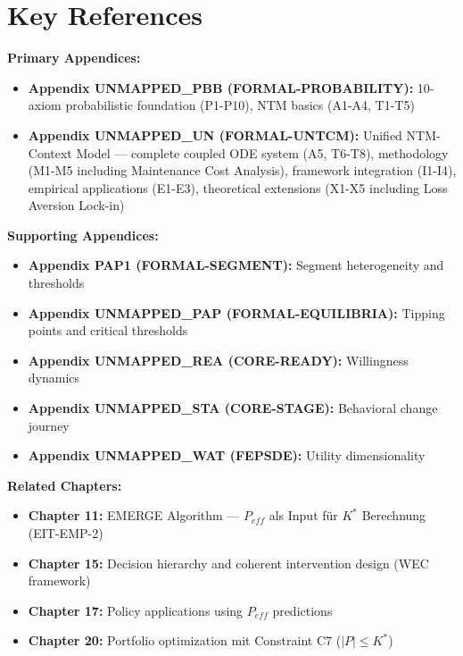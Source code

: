 \section{Key References}

\textbf{Primary Appendices:}
\begin{itemize}[nosep]
    \item \textbf{Appendix UNMAPPED_PBB (FORMAL-PROBABILITY):} 10-axiom probabilistic foundation (P1-P10), NTM basics (A1-A4, T1-T5)
    \item \textbf{Appendix UNMAPPED_UN (FORMAL-UNTCM):} Unified NTM-Context Model --- complete coupled ODE system (A5, T6-T8), methodology (M1-M5 including Maintenance Cost Analysis), framework integration (I1-I4), empirical applications (E1-E3), theoretical extensions (X1-X5 including Loss Aversion Lock-in)
\end{itemize}

\textbf{Supporting Appendices:}
\begin{itemize}[nosep]
    \item \textbf{Appendix PAP1 (FORMAL-SEGMENT):} Segment heterogeneity and thresholds
    \item \textbf{Appendix UNMAPPED_PAP (FORMAL-EQUILIBRIA):} Tipping points and critical thresholds
    \item \textbf{Appendix UNMAPPED_REA (CORE-READY):} Willingness dynamics
    \item \textbf{Appendix UNMAPPED_STA (CORE-STAGE):} Behavioral change journey
    \item \textbf{Appendix UNMAPPED_WAT (FEPSDE):} Utility dimensionality
\end{itemize}

\textbf{Related Chapters:}
\begin{itemize}[nosep]
    \item \textbf{Chapter 11:} EMERGE Algorithm — $P_{eff}$ als Input für $K^*$ Berechnung (EIT-EMP-2)
    \item \textbf{Chapter 15:} Decision hierarchy and coherent intervention design (WEC framework)
    \item \textbf{Chapter 17:} Policy applications using $P_{eff}$ predictions
    \item \textbf{Chapter 20:} Portfolio optimization mit Constraint C7 ($|P| \leq K^*$)
\end{itemize}

